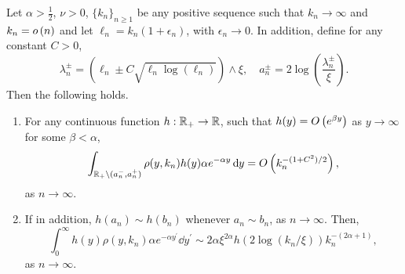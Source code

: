 \begin{lemma}\label{lem:concentration_argument}
Let $\alpha > \frac{1}{2}$, $\nu > 0$, $\{k_n\}_{n \ge 1}$ be any positive sequence such that $k_n \to \infty$ and $k_n = o\left(n\right)$ and let $\ell_n = k_n(1 + \epsilon_n)$, with $\epsilon_n \to 0$. In addition, define for any constant $C > 0$,
\[
	\lambda_n^\pm = (\ell_n \pm C \sqrt{\ell_n \log(\ell_n)}) \wedge \xi, 
	\quad a_n^\pm = 2 \log\left(\frac{\lambda_n^\pm}{\xi}\right).
\] 
Then the following holds.
\begin{enumerate}
\item For any continuous function $h : {\mathbb R}_+ \rightarrow  {\ensuremath{\mathbb R}}$, such that $h(y) = O\left(e^{\beta y}\right)$ as $y \to \infty$ for some $\beta < \alpha$, 
\begin{equation}\label{eq:error_bound_int_rho_not_K}
	\int_{{\mathbb R}_+ \setminus (a_n^-, a_n^+)} \rho(y,k_n) h(y) \alpha e^{-\alpha y} \operatorname{\mathrm{d}\hspace{-2pt}} y
	= O\left(k_n^{-(1+C^2)/2}\right),
\end{equation}
as $n \to \infty$.
\item If in addition, $h(a_n) \sim h(b_n)$ whenever $a_n \sim b_n$, as $n \to \infty$. Then,
\begin{equation}\label{eq:concentration_h_rho}
	\int_0^\infty h(y) \rho(y,k_n) \alpha e^{-\alpha y^\prime} \dd y^\prime \sim  
		2\alpha \xi^{2\alpha} h(2\log(k_n/\xi)) k_n^{-(2\alpha + 1)},
\end{equation}
as $n \to \infty$.
\end{enumerate}
\end{lemma}

